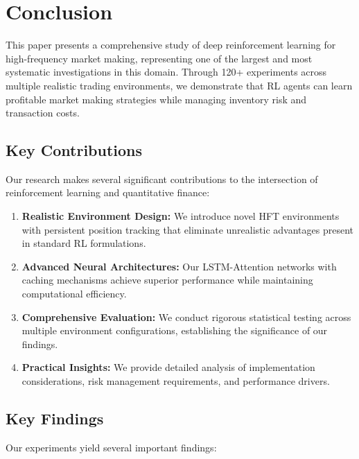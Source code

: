 \documentclass[conference]{IEEEtran}
\begin{document}
\section{Conclusion}

This paper presents a comprehensive study of deep reinforcement learning for high-frequency market making, representing one of the largest and most systematic investigations in this domain. Through 120+ experiments across multiple realistic trading environments, we demonstrate that RL agents can learn profitable market making strategies while managing inventory risk and transaction costs.

\subsection{Key Contributions}

Our research makes several significant contributions to the intersection of reinforcement learning and quantitative finance:

\begin{enumerate}
\item \textbf{Realistic Environment Design:} We introduce novel HFT environments with persistent position tracking that eliminate unrealistic advantages present in standard RL formulations.

\item \textbf{Advanced Neural Architectures:} Our LSTM-Attention networks with caching mechanisms achieve superior performance while maintaining computational efficiency.

\item \textbf{Comprehensive Evaluation:} We conduct rigorous statistical testing across multiple environment configurations, establishing the significance of our findings.

\item \textbf{Practical Insights:} We provide detailed analysis of implementation considerations, risk management requirements, and performance drivers.
\end{enumerate}

\subsection{Key Findings}

Our experiments yield several important findings:
\end{document}

